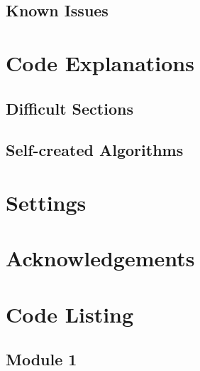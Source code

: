 \subsection{Known Issues}

\section{Code Explanations}

\subsection{Difficult Sections}

\subsection{Self-created Algorithms}

\section{Settings}

\section{Acknowledgements}

\section{Code Listing}
\begin{landscape}
\subsection{Module 1}
\begin{comment}
\pythonfile[firstline=5]{./tex/function_programs/print_function.py}
\end{comment}
\end{landscape}
